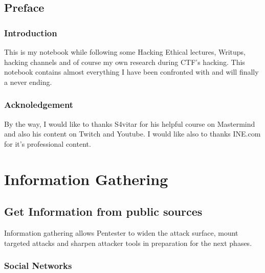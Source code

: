 \documentclass{assets/ipesethesis}
\begin{document}
\hypertarget{preface-1}{%
\chapter*{Preface}\label{preface-1}}

\hypertarget{introduction-1}{%
\section*{Introduction}\label{introduction-1}}

This is my notebook while following some Hacking Ethical lectures, Writups, hacking channels and of course my own research during CTF's hacking.
This notebook contains almost everything I have been confronted with and will finally a never ending.

\hypertarget{acknoledgement-1}{%
\section*{Acknoledgement}\label{acknoledgement-1}}

By the way, I would like to thanks S4vitar for his helpful course on Mastermind and also his content on Twitch and Youtube.
I would like also to thanks INE.com for it's professional content.

\hypertarget{part-information-gathering}{%
\part{Information Gathering}\label{part-information-gathering}}

\hypertarget{get-information-from-public-sources}{%
\chapter*{Get Information from public sources}\label{get-information-from-public-sources}}

Information gathering allows Pentester to widen the attack surface, mount targeted attacks and sharpen attacker tools in preparation for the next phases.

\hypertarget{social-networks}{%
\section*{Social Networks}\label{social-networks}}
\end{document}
